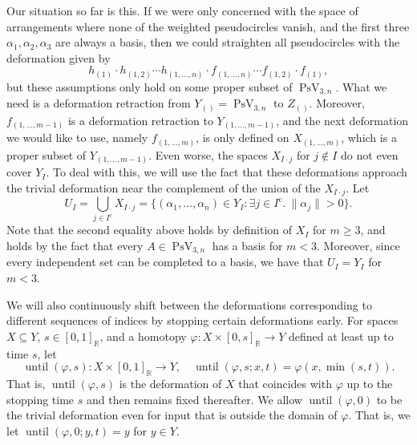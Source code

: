 \documentclass[11pt]{article}
\numberwithin{equation}{section}
\theoremstyle{remark}
\let\mb\mathbb
\let\phi\varphi
\newcommand{\compl}[1]{{{#1}^{\text{c}}}}
\DeclareMathOperator{\pstief}{PsV}
\DeclareMathOperator{\upto}{until}
\begin{document}
Our situation so far is this.
If we were only concerned with the space of arrangements where none of the weighted pseudocircles vanish, and the first three $\alpha_1,\alpha_2,\alpha_3$ are always a basis, then we could straighten all pseudocircles with the deformation given by
\begin{equation}\label{deformation-naive}
h_{(1)} \cdot h_{(1,2)} \cdots h_{(1,\dots,n)} \cdot f_{(1,\dots,n)} \cdots f_{(1,2)} \cdot f_{(1)},
\end{equation}
but these assumptions only hold on some proper subset of $\pstief_{3,n}$.
What we need is a deformation retraction from $Y_{()} = \pstief_{3,n}$ to $Z_{()}$.
Moreover, $f_{(1,\dots,{m-1})}$ is a defor\-mation retraction to $Y_{(1,\dots,{m-1})}$, and the next deformation we would like to use, namely $f_{(1,\dots,m)}$, is only defined on $X_{(1,\dots,m)}$, which is a proper subset of $Y_{(1,\dots,{m-1})}$.
Even worse, the spaces $X_{I\cdot j}$ for $j \not\in I$ do not even cover $Y_I$.
To deal with this, we will use the fact that these deformations approach the trivial deformation near the complement of the union of the $X_{I\cdot j}$.
Let
\[ U_I = \bigcup_{j\in\compl{I}} X_{I\cdot j}
=\{ (\alpha_1,\dots,\alpha_n) \in Y_I:\exists j \in \compl{I}.\ \|\alpha_j\| > 0\}. \]
Note that the second equality above holds by definition of $X_I$ for $m \geq 3$, and holds by the fact that every $A \in \pstief_{3,n}$ has a basis for $m <3$.
Moreover, since every independent set can be completed to a basis, we have that $U_I = Y_I$ for $m < 3$.

We will also continuously shift between the deformations corresponding to different sequences of indices by stopping certain deformations early.
For spaces $X \subseteq Y$, \hbox{$s \in [0,1]_\mb{R}$}, and a homotopy $\phi:X \times [0,s]_\mb{R} \to Y$ defined at least up to time $s$, let
\[ \upto(\phi,s) : X \times [0,1]_\mb{R} \to Y, \quad \upto(\phi,s;x,t) = \phi(x,\min(s,t)). \]
That is, $\upto(\phi,s)$ is the deformation of $X$ that coincides with $\phi$ up to the stopping time $s$ and then remains fixed thereafter.
We allow $\upto(\phi,0)$ to be the trivial deformation even for input that is outside the domain of $\phi$.
That is, we let $\upto(\phi,0; y,t) = y$ for $y \in Y$.
\end{document}
